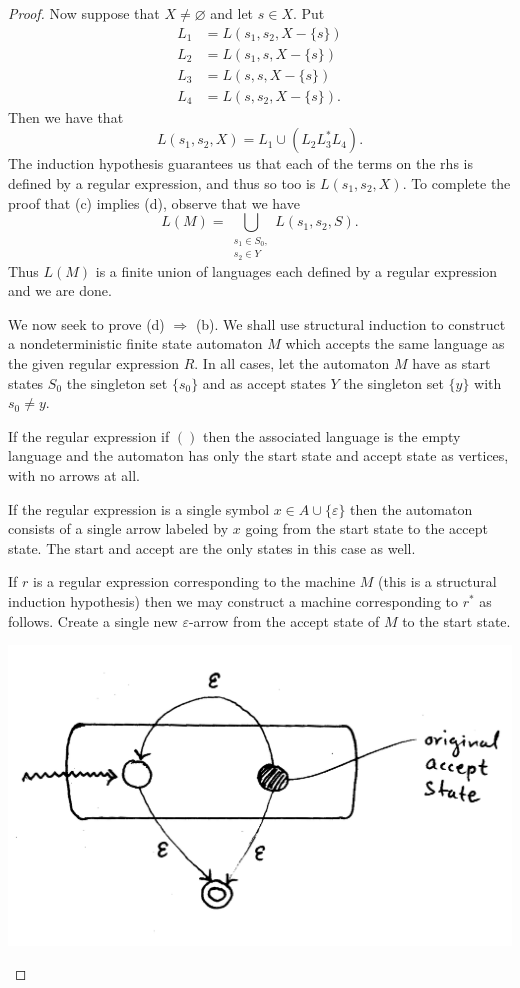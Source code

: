 \begin{proof}
    Now suppose that $X\neq \varnothing$ and let $s\in X$. Put
    \begin{align*}
        L_1 & = L(s_1,s_2,X - \{s\}) \\
        L_2 & = L(s_1,s  ,X - \{s\}) \\
        L_3 & = L(s  ,s  ,X - \{s\}) \\
        L_4 & = L(s  ,s_2,X - \{s\}).
    \end{align*} Then we have that \[L(s_1,s_2,X) = L_1 \cup
    (L_2L_3^*L_4).\] The induction hypothesis guarantees us that each
    of the terms on the rhs is defined by a regular expression, and
    thus so too is $L(s_1,s_2,X)$. To complete the proof that (c)
    implies (d), observe that we have \[L(M) = \bigcup_{\substack{s_1
    \in S_0,\\ s_2\in Y}} L(s_1,s_2,S).\] Thus $L(M)$ is a finite
    union of languages each defined by a regular expression and we are
    done.

    We now seek to prove (d) $\Rightarrow$ (b). We shall use
    structural induction to construct a nondeterministic finite state
    automaton $M$ which accepts the same language as the given regular
    expression $R$. In all cases, let the automaton $M$ have as start
    states $S_0$ the singleton set $\{s_0\}$ and as accept states $Y$
    the singleton set $\{y\}$ with $s_0 \neq y$.

    If the regular expression if $()$ then the associated language is
    the empty language and the automaton has only the start state and
    accept state as vertices, with no arrows at all.

    If the regular expression is a single symbol $x\in A\cup
    \{\varepsilon\}$ then the automaton consists of a single arrow
    labeled by $x$ going from the start state to the accept state.
    The start and accept are the only states in this case as well.

    If $r$ is a regular expression corresponding to the machine $M$
    (this is a structural induction hypothesis) then we may construct
    a machine corresponding to $r^*$ as follows.  Create a single new
    $\varepsilon$-arrow from the accept state of $M$ to the start
    state.

    \begin{center}
        \includegraphics[scale=0.2]{resources/1-7.pdf}
    \end{center}


\end{proof}
